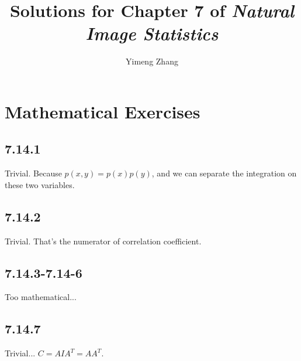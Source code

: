 \documentclass[12pt]{article}
\title{Solutions for Chapter 7 of \emph{Natural Image Statistics}}
\author{Yimeng Zhang}
\begin{document}
\maketitle





\section{Mathematical Exercises} %
\label{sec:mathematical_exercises}

\subsection{7.14.1} %
\label{sub:7_14_1}
Trivial. Because $p(x,y) = p(x)p(y)$, and we can separate the integration on these two variables.

\subsection{7.14.2} %
\label{sub:7_14_2}
Trivial. That's the numerator of correlation coefficient.

\subsection{7.14.3-7.14-6} %
\label{sub:7_14_3_7_14_6}
Too mathematical...

\subsection{7.14.7} %
\label{sub:7_14_7}
Trivial... $C = A I A^T = A A^T$.
\end{document}
